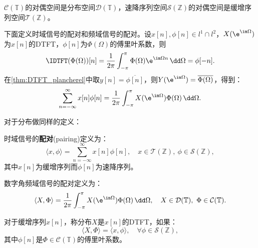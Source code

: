 $\mathcal{C}(\mathbb{T})$的对偶空间是分布空间$\mathcal{D}(\mathbb{T})$，速降序列空间$\mathcal{S}(\mathbb{Z})$的对偶空间是缓增序列空间$\mathcal{T}(\mathbb{Z})$。

下面定义时域信号的配对和频域信号的配对。设$x[n],\phi[n]\in l^1\cap l^2$，$X(\e^{\im\Omega})$为$x[n]$的DTFT，$\phi[n]$为$\Phi(\Omega)$的傅里叶系数，则
\begin{equation}
    \IDTFT(\Phi(\Omega))[n]=\frac{1}{2\pi}\int_{-\pi}^{\pi}\Phi(\Omega)\e^{\im\Omega n}\,\dd\Omega=\phi[-n].
\end{equation}
在\cref{thm:DTFT_plancherel}中取$y[n]=\overline{\phi[n]}$，则$Y(\e^{\im\Omega})=\overline{\Phi(\Omega)}$，得到：
\begin{equation}
    \sum_{n=-\infty}^{\infty}x[n]\phi[n]=\frac{1}{2\pi}\int_{-\pi}^{\pi}X(\e^{\im\Omega})\Phi(\Omega)\,\dd\Omega.
\end{equation}

对于分布做同样的定义：

\begin{definition}[配对]
    时域信号的\textbf{配对}(pairing)定义为：
    \begin{equation}
        \langle x,\phi\rangle=\sum_{n=-\infty}^{\infty}x[n]\phi[n],\quad x\in\mathcal{T}(\mathbb{Z}),\ \phi\in\mathcal{S}(\mathbb{Z}),
    \end{equation}
    其中$x[n]$为缓增序列而$\phi[n]$为速降序列。

    数字角频域信号的配对定义为：
    \begin{equation}
        \langle X,\Phi\rangle=\frac{1}{2\pi}\int_{-\pi}^{\pi}X(\e^{\im\Omega})\Phi(\Omega)\,\dd\Omega,\quad X\in\mathcal{D}(\mathbb{T}),\ \Phi\in\mathcal{C}(\mathbb{T}).
    \end{equation}
\end{definition}

\begin{definition}[缓增序列的离散时间傅里叶变换]
    对于缓增序列$x[n]$，称分布$X$是$x[n]$的DTFT，如果：
    \begin{equation}
        \langle X,\Phi\rangle=\langle x,\phi\rangle,\quad \forall \phi\in\mathcal{S}(\mathbb{Z}),
    \end{equation}
    其中$\phi[n]$是$\Phi\in\mathcal{C}(\mathbb{T})$的傅里叶系数。
\end{definition}

